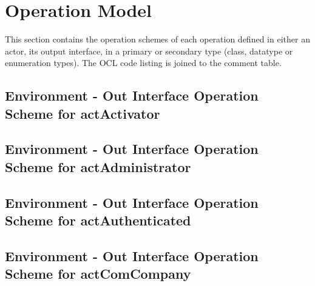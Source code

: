 \chapter{Operation Model}
\label{chap:lu.uni.lassy.excalibur.examples.icrash-OM}

This section contains the operation schemes of each operation defined in either an actor, its output interface, in a primary or secondary type (class, datatype or enumeration types). 
The \msrmessir OCL code listing is joined to the comment table.

\lstset{
float,
basicstyle=\scriptsize,
language=Messir,
breakatwhitespace=false,
tabsize=2,
breaklines=true,
numbers=left,
emptylines=1,
numbersep=5pt,
showspaces=false,
showstringspaces=false,
showtabs=false
} 



		
\section{Environment - Out Interface Operation Scheme for actActivator}
\label{OM-EM-OutInterface-OS-actActivator}


\section{Environment - Out Interface Operation Scheme for actAdministrator}
\label{OM-EM-OutInterface-OS-actAdministrator}



\section{Environment - Out Interface Operation Scheme for actAuthenticated}
\label{OM-EM-OutInterface-OS-actAuthenticated}


\section{Environment - Out Interface Operation Scheme for actComCompany}
\label{OM-EM-OutInterface-OS-actComCompany}


